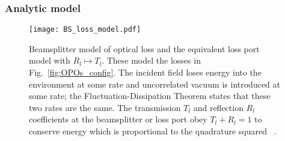 
\subsubsection{Analytic model}
\label{sec:dOPO_model}

\begin{figure}
	\centering
	\texttt{[image: BS\_loss\_model.pdf]}
	\caption{Beamsplitter model of optical loss and the equivalent loss port model with $R_l\mapsto T_l$. These model the losses in Fig.~\ref{fig:OPOs_config}. The incident field loses energy into the environment at some rate and uncorrelated vacuum is introduced at some rate; the Fluctuation-Dissipation Theorem states that these two rates are the same. The transmission $T_l$ and reflection $R_l$ coefficients at the beamsplitter or loss port obey $T_l+R_l=1$ to conserve energy which is proportional to the quadrature squared~\cite{} .}
	\label{fig:beamsplitter_loss}
\end{figure}


